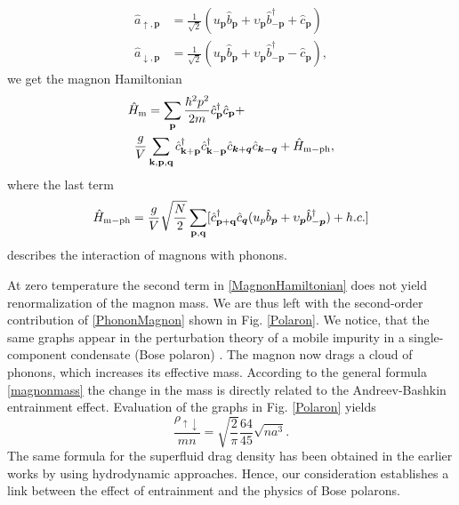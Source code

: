 \documentclass[reprint,superscriptaddress,showpacs,nofootinbib,aps,pra]{revtex4-1}
\begin{document}
\begin{equation}
\label{ReducedBogoliubov}
\begin{split}
\hat a_{\uparrow,\bm p}&=\frac{1}{\sqrt{2}}(u_{\bm p} \hat b_{\bm p}+\upsilon_{\bm p} \hat b_{-\bm p}^\dagger+\hat c_{\bm p})\\
\hat a_{\downarrow,\bm p}&=\frac{1}{\sqrt{2}}(u_{\bm p} \hat b_{\bm p}+\upsilon_{\bm p} \hat b_{-\bm p}^\dagger-\hat c_{\bm p}),
\end{split}
\end{equation}
we get the magnon Hamiltonian
\begin{equation}
\label{MagnonHamiltonian}
\begin{split}
\hat H_\mathrm{m}&=\sum_{\textbf{p}}\frac{\hbar^2 p^2}{2m}\hat c_{ \textbf{p}}^{\dag} \hat c_{\textbf{p}}+\\
\frac{g}{V}&\sum_{\textbf k,\textbf p,\textbf q}\hat c_{\textbf k+\textbf p}^{\dag} \hat c_{\textbf k-\textbf p}^{\dag} \hat c_{\bm k+\bm q}\hat c_{\bm k-\bm q}+\hat H_{\mathrm{m}-\mathrm{ph}},
\end{split}
\end{equation}
where the last term
\begin{equation}
\label{PhononMagnon}
\hat H_{\mathrm{m}-\mathrm{ph}}=\frac{g}{V}\sqrt{\frac{N}{2}}\sum_{\textbf p,\textbf q}[\hat c_{\textbf p+\textbf q}^{\dag}\hat c_{\bm q}(u_p \hat b_{\bm p}+\upsilon_{\bm p} \hat b_{-\bm p}^\dagger)+h.c.]
\end{equation} 
describes the interaction of magnons with phonons. 

At zero temperature the second term in \eqref{MagnonHamiltonian} does not yield renormalization of the magnon mass. We are thus left with the second-order contribution of \eqref{PhononMagnon} shown in Fig. \ref{Polaron}. We notice, that the same graphs appear in the perturbation theory of a mobile impurity in a single-component condensate (Bose polaron) \cite{Christensen}. The magnon now drags a cloud of phonons, which increases its effective mass. According to the general formula \eqref{magnonmass} the change in the mass is directly related to the Andreev-Bashkin entrainment effect. Evaluation of the graphs in Fig. \ref{Polaron} yields
\begin{equation}
\label{DiluteDrag}
\frac{\rho_{\uparrow\downarrow}}{mn}=\sqrt{\frac{2}{\pi}}\frac{64}{45}\sqrt{na^3}.
\end{equation}
The same formula for the superfluid drag density has been obtained in the earlier works \cite{Pastukhov1, Fil} by using hydrodynamic approaches. Hence, our consideration establishes a link between the effect of entrainment and the physics of Bose polarons.
 
\end{document}
